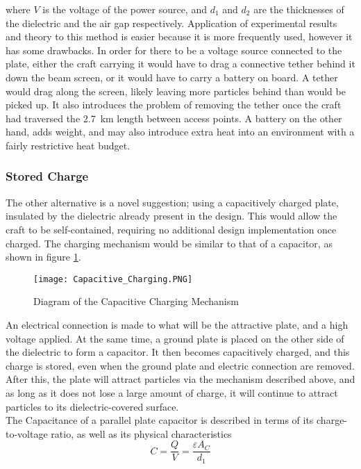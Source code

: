 \documentclass[../main.tex]{subfiles}
\begin{document}
where $V$ is the voltage of the power source, and $d_{1}$ and $d_{2}$ are the thicknesses of the dielectric and the air gap respectively.
Application of experimental results and theory to this method is easier because it is more frequently used, however it has some drawbacks.
In order for there to be a voltage source connected to the plate, either the craft carrying it would have to drag a connective tether behind it down the beam screen, or it would have to carry a battery on board.
A tether would drag along the screen, likely leaving more particles behind than would be picked up.
It also introduces the problem of removing the tether once the craft had traversed the \SI{2.7}{\kilo\metre} length between access points.
A battery on the other hand, adds weight, and may also introduce extra heat into an environment with a fairly restrictive heat budget.

\subsubsection{Stored Charge}
The other alternative is a novel suggestion; using a capacitively charged plate, insulated by the dielectric already present in the design.
This would allow the craft to be self-contained, requiring no additional design implementation once charged.
The charging mechanism would be similar to that of a capacitor, as shown in figure \ref{fig:CapacitiveCharging}.

\begin{figure}[ht]
	\centering
	\texttt{[image: Capacitive\_Charging.PNG]}
	\caption{Diagram of the Capacitive Charging Mechanism}
	\label{fig:CapacitiveCharging}
\end{figure}

An electrical connection is made to what will be the attractive plate, and a high voltage applied.
At the same time, a ground plate is placed on the other side of the dielectric to form a capacitor.
It then becomes capacitively charged, and this charge is stored, even when the ground plate and electric connection are removed.
After this, the plate will attract particles via the mechanism described above, and as long as it does not lose a large amount of charge, it will continue to attract particles to its dielectric-covered surface.\\

The Capacitance of a parallel plate capacitor is described in terms of its charge-to-voltage ratio, as well as its physical characteristics
\begin{equation}
C = \frac{Q}{V} = \frac{\varepsilon A_{C}}{d_{1}}
\end{equation}
\end{document}
